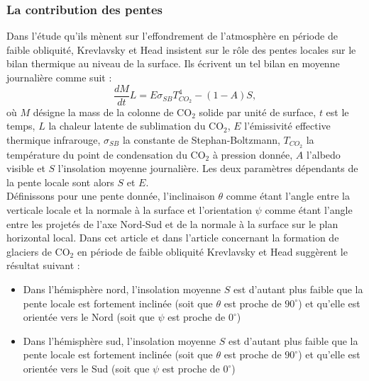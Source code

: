 \documentclass[11pt,a4paper]{article}
\begin{document}
\subsubsection{La contribution des pentes}
Dans l'étude qu'ils mènent sur l'effondrement de l'atmosphère en période de faible obliquité, Krevlavsky et Head \citep{Kres:05} insistent sur le rôle des pentes locales sur le bilan thermique au niveau de la surface. Ils écrivent un tel bilan en moyenne journalière comme suit :
\begin{equation}
\label{fonda}
\frac{dM}{dt}L=E\sigma_{SB}T^4_{CO_2} - (1-A)S,
\end{equation}
où $M$ désigne la mass de la colonne de CO$_2$ solide par unité de surface, $t$ est le temps, $L$ la chaleur latente de sublimation du CO$_2$, $E$ l'émissivité effective thermique infrarouge, $\sigma_{SB}$ la constante de Stephan-Boltzmann, $T_{CO_2}$ la température du point de condensation du CO$_2$ à pression donnée, $A$ l'albedo visible et $S$ l'insolation moyenne journalière. Les deux paramètres dépendants de la pente locale sont alors $S$ et $E$. \\

Définissons pour une pente donnée, l'inclinaison $\theta$ comme étant l'angle entre la verticale locale et la normale à la surface et l'orientation $\psi$ comme étant l'angle entre les projetés de l'axe Nord-Sud et de la normale à la surface sur le plan horizontal local. Dans cet article et dans l'article concernant la formation de glaciers de CO$_2$ en période de faible obliquité \citep{Kres:11} Krevlavsky et Head suggèrent le résultat suivant :
\begin{itemize}
\item Dans l'hémisphère nord, l'insolation moyenne $S$ est d'autant plus faible que la pente locale est fortement inclinée (soit que $\theta$ est proche de $90^\circ$) et qu'elle est orientée vers le Nord (soit que $\psi$ est proche de $0^\circ$) 
\item Dans l'hémisphère sud, l'insolation moyenne $S$ est d'autant plus faible que la pente locale est fortement inclinée (soit que $\theta$ est proche de $90^\circ$) et qu'elle est orientée vers le Sud (soit que $\psi$ est proche de $0^\circ$) \\
\end{itemize}
\end{document}
